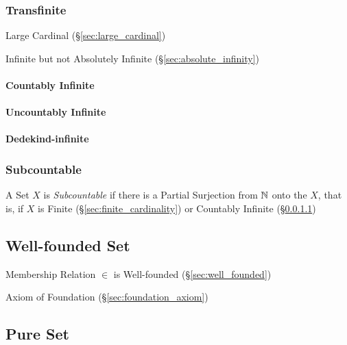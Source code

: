 \subsubsection{Transfinite}\label{sec:transfinite}

Large Cardinal (\S\ref{sec:large_cardinal})

Infinite but not Absolutely Infinite (\S\ref{sec:absolute_infinity})



\paragraph{Countably Infinite}\label{sec:countably_infinite}

\paragraph{Uncountably Infinite}\label{sec:uncountably_infinite}

\paragraph{Dedekind-infinite}\label{sec:dedekind_infinite}



\subsubsection{Subcountable}\label{sec:subcountable}

A Set $X$ is \emph{Subcountable} if there is a Partial Surjection from
$\mathbb{N}$ onto the $X$, that is, if $X$ is Finite
(\S\ref{sec:finite_cardinality}) or Countably Infinite
(\S\ref{sec:countably_infinite})



\subsection{Well-founded Set}\label{sec:wellfounded_set}

Membership Relation $\in$ is Well-founded (\S\ref{sec:well_founded})

Axiom of Foundation (\S\ref{sec:foundation_axiom})



\subsection{Pure Set}\label{sec:pure_set}

